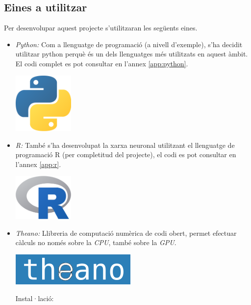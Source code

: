 \documentclass[12pt]{article}
\begin{document}
\clearpage
\subsection{Eines a utilitzar}
Per desenvolupar aquest projecte s'utilitzaran les següents eines.
\begin{itemize}
	\item \textit{Python:} Com a llenguatge de programació (a nivell d'exemple), s'ha decidit utilitzar python perquè és un dels llenguatges més utilitzats en aquest àmbit. El codi complet es pot consultar en l'annex \ref{app:python}.
	\begin{center}
		\includegraphics[width=3cm]{imatges/eines/python.png}
	\end{center}
	
	\item \textit{R:} També s'ha desenvolupat la xarxa neuronal utilitzant el llenguatge de programació R (per completitud del projecte), el codi es pot consultar en l'annex \ref{app:r}.
	\begin{center}
		\includegraphics[width=3cm]{imatges/eines/r.png}
	\end{center}	
	
	\item \textit{Theano:} Llibreria de computació numèrica de codi obert, permet efectuar càlculs no només sobre la \textit{CPU}, també sobre la \textit{GPU}.
	\begin{center}
		\includegraphics[scale=0.4]{imatges/eines/theano.png}
	\end{center}
	Instal·lació: 	
	

\end{itemize}
\end{document}

